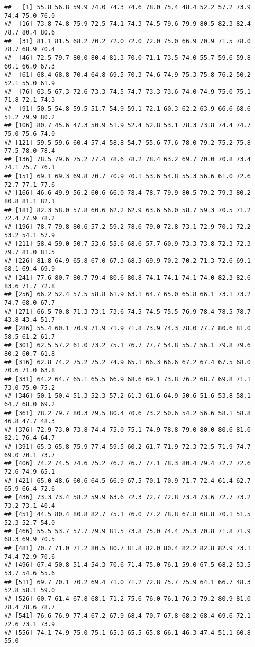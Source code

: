 \documentclass[
]{article}
\begin{document}
\begin{verbatim}
##   [1] 55.8 56.8 59.9 74.0 74.3 74.6 78.0 75.4 48.4 52.2 57.2 73.9 74.4 75.0 76.0
##  [16] 73.8 74.8 75.9 72.5 74.1 74.3 74.5 79.6 79.9 80.5 82.3 82.4 78.7 80.4 80.6
##  [31] 81.1 81.5 68.2 70.2 72.0 72.0 72.0 75.0 66.9 70.9 71.5 78.0 78.7 68.9 70.4
##  [46] 72.5 79.7 80.0 80.4 81.3 70.0 71.1 73.5 74.0 55.7 59.6 59.8 60.1 66.0 67.3
##  [61] 68.4 68.8 70.4 64.8 69.5 70.3 74.6 74.9 75.3 75.8 76.2 50.2 52.1 55.0 61.9
##  [76] 63.5 67.3 72.6 73.3 74.5 74.7 73.3 73.6 74.0 74.9 75.0 75.1 71.8 72.1 74.3
##  [91] 50.5 54.8 59.5 51.7 54.9 59.1 72.1 60.3 62.2 63.9 66.6 68.6 51.2 79.9 80.2
## [106] 80.7 45.6 47.3 50.9 51.9 52.4 52.8 53.1 78.3 73.8 74.4 74.7 75.0 75.6 74.0
## [121] 59.5 59.6 60.4 57.4 58.8 54.7 55.6 77.6 78.0 79.2 75.2 75.8 77.5 78.0 78.4
## [136] 78.5 79.6 75.2 77.4 78.6 78.2 78.4 63.2 69.7 70.0 70.8 73.4 74.1 75.7 76.1
## [151] 69.1 69.3 69.8 70.7 70.9 70.1 53.6 54.8 55.3 56.6 61.0 72.6 72.7 77.1 77.6
## [166] 46.6 49.9 56.2 60.6 66.0 78.4 78.7 79.9 80.5 79.2 79.3 80.2 80.8 81.1 82.1
## [181] 82.3 58.0 57.8 60.6 62.2 62.9 63.6 56.0 58.7 59.3 70.5 71.2 72.4 77.9 78.2
## [196] 78.7 79.8 80.6 57.2 59.2 78.6 79.0 72.8 73.1 72.9 70.1 72.2 53.2 54.1 57.9
## [211] 58.4 59.0 50.7 53.6 55.6 68.6 57.7 60.9 73.3 73.8 72.3 72.3 79.7 81.0 81.5
## [226] 81.8 64.9 65.8 67.0 67.3 68.5 69.9 70.2 70.2 71.3 72.6 69.1 68.1 69.4 69.9
## [241] 77.6 80.7 80.7 79.4 80.6 80.8 74.1 74.1 74.1 74.0 82.3 82.6 83.6 71.7 72.8
## [256] 66.2 52.4 57.5 58.8 61.9 63.1 64.7 65.0 65.8 66.1 73.1 73.2 74.7 68.0 67.7
## [271] 66.5 70.8 71.3 73.1 73.6 74.5 74.5 75.5 76.9 78.4 78.5 78.7 43.8 43.4 51.7
## [286] 55.4 60.1 70.9 71.9 71.9 71.8 73.9 74.3 78.0 77.7 80.6 81.0 58.5 61.2 61.7
## [301] 62.5 57.2 61.0 73.2 75.1 76.7 77.7 54.8 55.7 56.1 79.8 79.6 80.2 60.7 61.8
## [316] 62.8 74.2 75.2 75.2 74.9 65.1 66.3 66.6 67.2 67.4 67.5 68.0 70.6 71.0 63.8
## [331] 64.2 64.7 65.1 65.5 66.9 68.6 69.1 73.8 76.2 68.7 69.8 71.1 73.0 75.0 75.2
## [346] 50.1 50.4 51.3 52.3 57.2 61.3 61.6 64.9 50.6 51.6 53.8 58.1 64.7 68.0 69.2
## [361] 78.2 79.7 80.3 79.5 80.4 70.6 73.2 50.6 54.2 56.6 58.1 58.8 46.8 47.7 48.3
## [376] 72.9 73.0 73.8 74.4 75.0 75.1 74.9 78.8 79.0 80.0 80.6 81.0 82.1 76.4 64.7
## [391] 65.3 65.8 75.9 77.4 59.5 60.2 61.7 71.9 72.3 72.5 71.9 74.7 69.0 70.1 73.7
## [406] 74.2 74.5 74.6 75.2 76.2 76.7 77.1 78.3 80.4 79.4 72.2 72.6 72.6 74.9 65.1
## [421] 65.0 48.6 60.6 64.5 66.9 67.5 70.1 70.9 71.7 72.4 61.4 62.7 65.9 66.4 72.6
## [436] 73.3 73.4 58.2 59.9 63.6 72.3 72.7 72.8 73.4 73.6 72.7 73.2 73.2 73.1 40.4
## [451] 44.5 80.4 80.8 82.7 75.1 76.0 77.2 78.8 67.8 68.8 70.1 51.5 52.3 52.7 54.0
## [466] 55.5 53.7 57.7 79.9 81.5 73.8 75.0 74.4 75.3 70.8 71.8 71.9 68.3 69.9 70.5
## [481] 70.7 71.0 71.2 80.5 80.7 81.8 82.0 80.4 82.2 82.8 82.9 73.1 74.4 72.9 70.6
## [496] 67.4 50.8 51.4 54.3 70.6 71.4 75.0 76.1 59.0 67.5 68.2 53.5 53.7 54.6 55.6
## [511] 69.7 70.1 70.2 69.4 71.0 71.2 72.8 75.7 75.9 64.1 66.7 48.3 52.8 58.1 59.0
## [526] 60.7 61.4 67.8 68.1 71.2 75.6 76.0 76.1 76.3 79.2 80.9 81.0 78.4 78.6 78.7
## [541] 76.6 76.9 77.4 67.2 67.9 68.4 70.7 67.8 68.2 68.4 69.6 72.1 72.6 73.1 73.9
## [556] 74.1 74.9 75.0 75.1 65.3 65.5 65.8 66.1 46.3 47.4 51.1 60.8 55.0
\end{verbatim}
\end{document}
